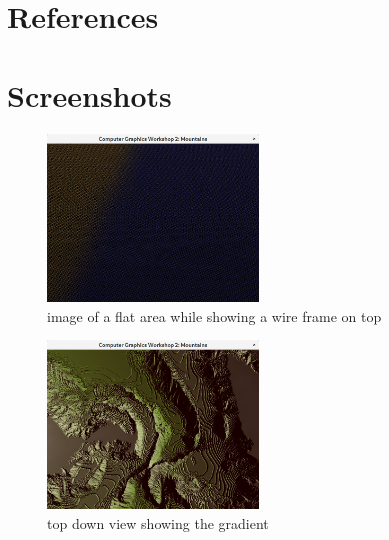 \documentclass[a4paper, 11pt]{article} %
\begin{document}
\section*{References}







\section*{Screenshots}


\begin{figure}[ht]
\caption{image of a flat area while showing a wire frame on top}
\centering
\includegraphics[width=0.5\textwidth]{wire_frame}
\end{figure}



\begin{figure}[ht]
\caption{top down view showing the gradient}
\centering
\includegraphics[width=0.5\textwidth]{down_view}
\end{figure}
\end{document}
